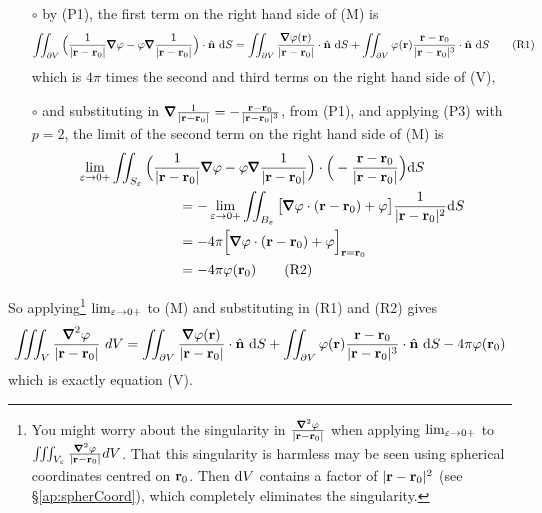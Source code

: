 \begin{itemize}\itemsep1pt \parskip0pt  %
\item[$\circ$]
by (P1), the first term on the right hand side of (M) is
\begin{equation}
\dblInt_{\partial V}\Big(\frac{1}{|\vr-\vr_0|}\vnabla\varphi
-\varphi\vnabla\frac{1}{|\vr-\vr_0|}\Big)\cdot\hn\ \dee{S}
=\dblInt_{\partial V}\frac{\vnabla\varphi(\vr)}{|\vr-\vr_0|}\cdot\hn\ \dee{S}
+\dblInt_{\partial V}\varphi(\vr)\frac{\vr-\vr_0}{|\vr-\vr_0|^3}\cdot\hn\ \dee{S}
\tag{R1}\end{equation}
which is $4\pi$ times the second and third terms on the right hand side of (V),


\item[$\circ$]
and substituting in 
$\vnabla \frac{1}{|\vr-\vr_0|} =-\frac{\vr-\vr_0}{|\vr-\vr_0|^3}$,
from (P1), and applying (P3) with $p=2$, the limit of the second 
term on the right hand side of (M) is
\begin{align}
&\lim_{\veps\rightarrow 0+}
\dblInt_{S_\veps}\Big(\frac{1}{|\vr-\vr_0|}\vnabla\varphi
-\varphi\vnabla\frac{1}{|\vr-\vr_0|}\Big)\cdot
        \Big(-\frac{\vr-\vr_0}{|\vr-\vr_0|}\Big) \dee{S}
\notag\\
&\hskip1in=-\lim_{\veps\rightarrow 0+}
\dblInt_{B_\veps}\big[\vnabla\varphi\cdot(\vr-\vr_0)+\varphi\big]
\frac{1}{|\vr-\vr_0|^2} \dee{S}
\notag\\
&\hskip1in=-4\pi\Big[\vnabla\varphi\cdot(\vr-\vr_0)+\varphi\Big]_{\vr=\vr_0}
\notag\\
&\hskip1in=-4\pi\varphi(\vr_0)
\tag{R2}\end{align}
\end{itemize}
So applying\footnote{You might worry about the singularity in 
$\frac{\vnabla^2\varphi}{|\vr-\vr_0|}$
when applying $\lim_{\varepsilon\rightarrow 0+}$ to $\tripInt_{V_\veps} \frac{\vnabla^2\varphi}{|\vr-\vr_0|} dV$. That this singularity 
is harmless may be seen using spherical coordinates centred on $\mathbf{r}_0$.
Then $\mathrm{d}V$ contains a factor of $|\mathbf{r}-\mathbf{r}_0|^2$ 
(see \S\ref{ap:spherCoord}), 
which completely eliminates the singularity. 
}
$\lim_{\varepsilon\rightarrow 0+}$ to (M) and substituting in (R1) and (R2) 
gives
\begin{align*}
\tripInt_{V}\frac{\vnabla^2\varphi}{|\vr-\vr_0|}\ dV
=\dblInt_{\partial V}\frac{\vnabla\varphi(\vr)}{|\vr-\vr_0|}\cdot\hn\ \dee{S}
+\dblInt_{\partial V}\varphi(\vr)\frac{\vr-\vr_0}{|\vr-\vr_0|^3}\cdot\hn\ \dee{S}
-4\pi\varphi(\vr_0)
\end{align*}
which is exactly equation (V).


